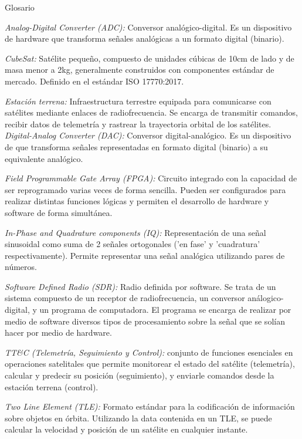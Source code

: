 \large{Glosario}

\textit{Analog-Digital Converter (ADC):} Conversor analógico-digital. Es un dispositivo de hardware que transforma señales analógicas a un formato digital (binario).

\textit{CubeSat:} Satélite pequeño, compuesto de unidades cúbicas de 10cm de lado y de masa menor a 2kg, generalmente construidos con componentes estándar de mercado. Definido en el estándar ISO 17770:2017.

\textit{Estación terrena:} Infraestructura terrestre equipada para comunicarse con satélites mediante enlaces de radiofrecuencia. Se encarga de transmitir comandos, recibir datos de telemetría y rastrear la trayectoria orbital de los satélites.\\

\textit{Digital-Analog Converter (DAC):} Conversor digital-analógico. Es un dispositivo de que transforma señales representadas en formato digital (binario) a su equivalente analógico.

\textit{Field Programmable Gate Array (FPGA):} Circuito integrado con la capacidad de ser reprogramado varias veces de forma sencilla. Pueden ser configurados para realizar distintas funciones lógicas y permiten el desarrollo de hardware y software de forma simultánea.

\textit{In-Phase and Quadrature components (IQ):} Representación de una señal sinusoidal como suma de 2 señales ortogonales ('en fase' y 'cuadratura' respectivamente). Permite representar una señal analógica utilizando pares de números.

\textit{Software Defined Radio (SDR):} Radio definida por software. Se trata de un sistema compuesto de un receptor de radiofrecuencia, un conversor análogico-digital, y un programa de computadora. El programa se encarga de realizar por medio de software diversos tipos de procesamiento sobre la señal que se solían hacer por medio de hardware.

\textit{TT\&C (Telemetría, Seguimiento y Control):} conjunto de funciones esenciales en operaciones satelitales que permite monitorear el estado del satélite (telemetría), calcular y predecir su posición (seguimiento), y enviarle comandos desde la estación terrena (control).

\textit{Two Line Element (TLE):} Formato estándar para la codificación de información sobre objetos en órbita. Utilizando la data contenida en un TLE, se puede calcular la velocidad y posición de un satélite en cualquier instante.

